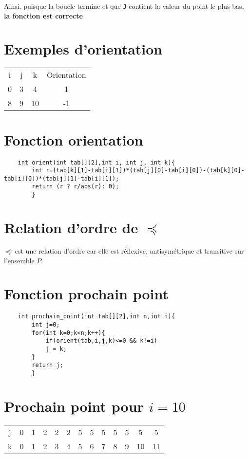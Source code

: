 \documentclass{article}
\begin{document}
Ainsi, puisque la boucle termine et que \texttt{J} contient la valeur du point le plus bas, \textbf{la fonction est correcte}

\section{Exemples d'orientation}
\begin{center}
    \begin{tabular}{ c c c c }
        i & j & k & Orientation \\ 
        0 & 3 & 4 & 1\\  
        8 & 9 & 10 & -1    
    \end{tabular}
\end{center}
\section{Fonction orientation}
\begin{verbatim}
    int orient(int tab[][2],int i, int j, int k){
        int r=(tab[k][1]-tab[i][1])*(tab[j][0]-tab[i][0])-(tab[k][0]-tab[i][0])*(tab[j][1]-tab[i][1]);
        return (r ? r/abs(r): 0);
        }
\end{verbatim}
\section{Relation d'ordre de $\preceq$}
$\preceq$ est une relation d'ordre car elle est réflexive, antisymétrique et transitive sur l'ensemble $P$.

\section{Fonction prochain point}
\begin{verbatim}
    int prochain_point(int tab[][2],int n,int i){
        int j=0;
        for(int k=0;k<n;k++){
            if(orient(tab,i,j,k)<=0 && k!=i)
            j = k;
        }
        return j;
        }
\end{verbatim}
\section{Prochain point pour $i=10$}
\begin{tabular}{c c  c  c  c  c  c  c  c  c  c  c  c}    
    j & 0 & 1 & 2 & 2 & 2 & 5 & 5 & 5 & 5 & 5 & 5 & 5 \\
    k & 0 & 1 & 2 & 3 & 4 & 5 & 6 & 7 & 8 & 9 & 10 & 11 \\
\end{tabular}
\end{document}
